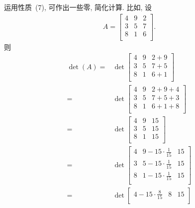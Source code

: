 \begin{example}
    运用性质~(7), 可作出一些零, 简化计算.
    比如,
    设
    \begin{align*}
        A = \begin{bmatrix}
                4 & 9 & 2 \\
                3 & 5 & 7 \\
                8 & 1 & 6 \\
            \end{bmatrix}.
    \end{align*}
    则
    \begin{align*}
        \det {(A)}
        = {} &
        \det {
            \begin{bmatrix}
                4 & 9 & 2 + 9 \\
                3 & 5 & 7 + 5 \\
                8 & 1 & 6 + 1 \\
            \end{bmatrix}
        }
        \\
        = {} &
        \det {
            \begin{bmatrix}
                4 & 9 & 2 + 9 + 4 \\
                3 & 5 & 7 + 5 + 3 \\
                8 & 1 & 6 + 1 + 8 \\
            \end{bmatrix}
        }
        \\
        = {} &
        \det {
            \begin{bmatrix}
                4 & 9 & 15 \\
                3 & 5 & 15 \\
                8 & 1 & 15 \\
            \end{bmatrix}
        }
        \\
        = {} &
        \det {
            \begin{bmatrix}
                4 & 9 - 15 \cdot \frac{1}{15} & 15 \\
                3 & 5 - 15 \cdot \frac{1}{15} & 15 \\
                8 & 1 - 15 \cdot \frac{1}{15} & 15 \\
            \end{bmatrix}
        }
        \\
        = {} &
        \det {
            \begin{bmatrix}
                4 - 15 \cdot \frac{8}{15} & 8 & 15 \\

\end{bmatrix}}
\end{align*}
\end{example}
